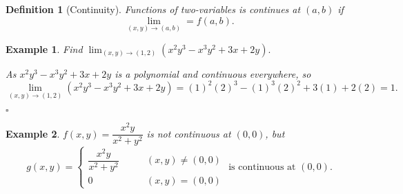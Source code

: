 \documentclass[12pt,a4paper]{article}
\newtheorem{df}{Definition}[subsection]
\newtheorem{eg}{Example}[subsection]
\newenvironment*{ans}{\par\indent{\textit{Answer. }}\par}{\par\hfill{$\square$}\par}
\begin{document}
\begin{df}[Continuity]
	Functions of two-variables is continues at $(a,b)$ if \[\lim_{(x,y)\to(a,b)}=f(a,b).\]
\end{df}
\begin{eg}
	Find $\displaystyle\lim_{(x,y)\to(1,2)}(x^2y^3-x^3y^2+3x+2y).$
	\begin{ans}
		As $x^2y^3-x^3y^2+3x+2y$ is a polynomial and continuous everywhere, so 
		\[\lim_{(x,y)\to(1,2)}(x^2y^3-x^3y^2+3x+2y)=(1)^2(2)^3-(1)^3(2)^2
		+3(1)+2(2)=1.\]
	\end{ans}
\end{eg}
\begin{eg}
	$f(x,y)=\dfrac{x^2y}{x^2+y^2}$ is not continuous at $(0,0)$, but \[g(x,y)=\begin{cases}\dfrac{x^2y}{x^2+y^2}\qquad &(x,y)\neq(0,0)\\0\qquad &(x,y)=(0,0)\end{cases}\text{ is continuous at }(0,0).\]
\end{eg}
\end{document}
